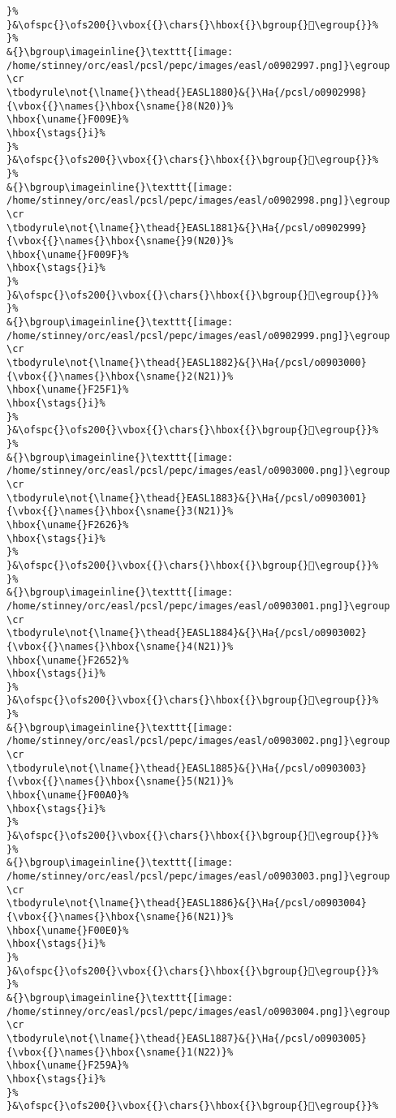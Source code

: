\begin{verbatim}
}%
}&\ofspc{}\ofs200{}\vbox{{}\chars{}\hbox{{}\bgroup{}󰂝\egroup{}}%
}%
&{}\bgroup\imageinline{}\texttt{[image: /home/stinney/orc/easl/pcsl/pepc/images/easl/o0902997.png]}\egroup
\cr
\tbodyrule\not{\lname{}\thead{}EASL1880}&{}\Ha{/pcsl/o0902998}{\vbox{{}\names{}\hbox{\sname{}8(N20)}%
\hbox{\uname{}F009E}%
\hbox{\stags{}i}%
}%
}&\ofspc{}\ofs200{}\vbox{{}\chars{}\hbox{{}\bgroup{}󰂞\egroup{}}%
}%
&{}\bgroup\imageinline{}\texttt{[image: /home/stinney/orc/easl/pcsl/pepc/images/easl/o0902998.png]}\egroup
\cr
\tbodyrule\not{\lname{}\thead{}EASL1881}&{}\Ha{/pcsl/o0902999}{\vbox{{}\names{}\hbox{\sname{}9(N20)}%
\hbox{\uname{}F009F}%
\hbox{\stags{}i}%
}%
}&\ofspc{}\ofs200{}\vbox{{}\chars{}\hbox{{}\bgroup{}󰂟\egroup{}}%
}%
&{}\bgroup\imageinline{}\texttt{[image: /home/stinney/orc/easl/pcsl/pepc/images/easl/o0902999.png]}\egroup
\cr
\tbodyrule\not{\lname{}\thead{}EASL1882}&{}\Ha{/pcsl/o0903000}{\vbox{{}\names{}\hbox{\sname{}2(N21)}%
\hbox{\uname{}F25F1}%
\hbox{\stags{}i}%
}%
}&\ofspc{}\ofs200{}\vbox{{}\chars{}\hbox{{}\bgroup{}󲗱\egroup{}}%
}%
&{}\bgroup\imageinline{}\texttt{[image: /home/stinney/orc/easl/pcsl/pepc/images/easl/o0903000.png]}\egroup
\cr
\tbodyrule\not{\lname{}\thead{}EASL1883}&{}\Ha{/pcsl/o0903001}{\vbox{{}\names{}\hbox{\sname{}3(N21)}%
\hbox{\uname{}F2626}%
\hbox{\stags{}i}%
}%
}&\ofspc{}\ofs200{}\vbox{{}\chars{}\hbox{{}\bgroup{}󲘦\egroup{}}%
}%
&{}\bgroup\imageinline{}\texttt{[image: /home/stinney/orc/easl/pcsl/pepc/images/easl/o0903001.png]}\egroup
\cr
\tbodyrule\not{\lname{}\thead{}EASL1884}&{}\Ha{/pcsl/o0903002}{\vbox{{}\names{}\hbox{\sname{}4(N21)}%
\hbox{\uname{}F2652}%
\hbox{\stags{}i}%
}%
}&\ofspc{}\ofs200{}\vbox{{}\chars{}\hbox{{}\bgroup{}󲙒\egroup{}}%
}%
&{}\bgroup\imageinline{}\texttt{[image: /home/stinney/orc/easl/pcsl/pepc/images/easl/o0903002.png]}\egroup
\cr
\tbodyrule\not{\lname{}\thead{}EASL1885}&{}\Ha{/pcsl/o0903003}{\vbox{{}\names{}\hbox{\sname{}5(N21)}%
\hbox{\uname{}F00A0}%
\hbox{\stags{}i}%
}%
}&\ofspc{}\ofs200{}\vbox{{}\chars{}\hbox{{}\bgroup{}󰂠\egroup{}}%
}%
&{}\bgroup\imageinline{}\texttt{[image: /home/stinney/orc/easl/pcsl/pepc/images/easl/o0903003.png]}\egroup
\cr
\tbodyrule\not{\lname{}\thead{}EASL1886}&{}\Ha{/pcsl/o0903004}{\vbox{{}\names{}\hbox{\sname{}6(N21)}%
\hbox{\uname{}F00E0}%
\hbox{\stags{}i}%
}%
}&\ofspc{}\ofs200{}\vbox{{}\chars{}\hbox{{}\bgroup{}󰃠\egroup{}}%
}%
&{}\bgroup\imageinline{}\texttt{[image: /home/stinney/orc/easl/pcsl/pepc/images/easl/o0903004.png]}\egroup
\cr
\tbodyrule\not{\lname{}\thead{}EASL1887}&{}\Ha{/pcsl/o0903005}{\vbox{{}\names{}\hbox{\sname{}1(N22)}%
\hbox{\uname{}F259A}%
\hbox{\stags{}i}%
}%
}&\ofspc{}\ofs200{}\vbox{{}\chars{}\hbox{{}\bgroup{}󲖚\egroup{}}%

\end{verbatim}
